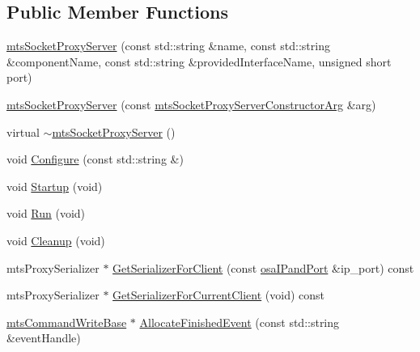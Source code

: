 \subsection*{Public Member Functions}
\begin{DoxyCompactItemize}
\item 
\hyperlink{classmts_socket_proxy_server_a6ebb4c4b1dfaa429094b3fdac1659471}{mts\-Socket\-Proxy\-Server} (const std\-::string \&name, const std\-::string \&component\-Name, const std\-::string \&provided\-Interface\-Name, unsigned short port)
\item 
\hyperlink{classmts_socket_proxy_server_ac55aba203dc89676c5fc133e5b9a6090}{mts\-Socket\-Proxy\-Server} (const \hyperlink{classmts_socket_proxy_server_constructor_arg}{mts\-Socket\-Proxy\-Server\-Constructor\-Arg} \&arg)
\item 
virtual \hyperlink{classmts_socket_proxy_server_ac16f10d6cf3bb67eda9c2f9797e69fec}{$\sim$mts\-Socket\-Proxy\-Server} ()
\item 
void \hyperlink{classmts_socket_proxy_server_afa15c24264a578805db0e08773a59044}{Configure} (const std\-::string \&)
\item 
void \hyperlink{classmts_socket_proxy_server_ac503a2964c4d1187775bf48a91708bbd}{Startup} (void)
\item 
void \hyperlink{classmts_socket_proxy_server_a10ea0b133dccf740841af2058b332ced}{Run} (void)
\item 
void \hyperlink{classmts_socket_proxy_server_a53e1c85a91a01f1e12301860e7de9673}{Cleanup} (void)
\item 
mts\-Proxy\-Serializer $\ast$ \hyperlink{classmts_socket_proxy_server_a53ec6e91f127a1a301cd6225bc92fdb4}{Get\-Serializer\-For\-Client} (const \hyperlink{structosa_i_pand_port}{osa\-I\-Pand\-Port} \&ip\-\_\-port) const 
\item 
mts\-Proxy\-Serializer $\ast$ \hyperlink{classmts_socket_proxy_server_a2af72d89d2922a1c1eb711c035cd90bb}{Get\-Serializer\-For\-Current\-Client} (void) const 
\item 
\hyperlink{classmts_command_write_base}{mts\-Command\-Write\-Base} $\ast$ \hyperlink{classmts_socket_proxy_server_a2c65e1478bf9b6224c567d7991132a1f}{Allocate\-Finished\-Event} (const std\-::string \&event\-Handle)
\end{DoxyCompactItemize}
